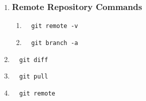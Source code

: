 \documentclass[11pt]{article}
\begin{document}
\begin{enumerate}
    \item  \subsubsection*{Remote Repository Commands}	  
    \begin{enumerate}
    	\item \begin{verbatim}  git remote -v\end{verbatim}
    	\item \begin{verbatim}  git branch -a\end{verbatim}
    \end{enumerate} 
   \item \begin{verbatim}  git diff\end{verbatim}
   \item \begin{verbatim}  git pull\end{verbatim}
   \item \begin{verbatim}  git remote\end{verbatim}
   \end{enumerate}
\end{document}
